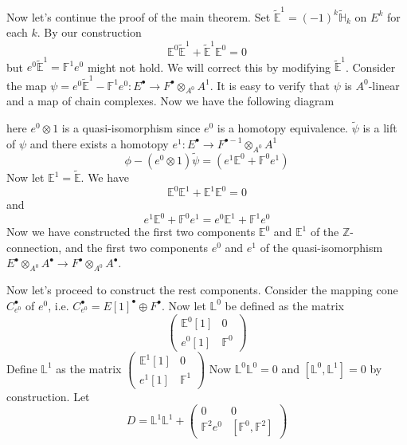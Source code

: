 \documentclass[12pt]{amsart}
\theoremstyle{definition}
\theoremstyle{remark}
\numberwithin{equation}{section}
\newcommand{\A}{{A}}
\newcommand{\Z}{{\mathbb{Z}}}
\newcommand{\1}{{\mathbb{1}}}
\newcommand{\bt}{\bullet}
\begin{document}
Now let's continue the proof of the main theorem. Set $\tilde{\mathbb{E}}^1 = (-1)^k \tilde{\mathbb{H}}_k$ on $E^k$ for each $k$. By our construction
\begin{equation*}
    \mathbb{E}^0 \tilde{\mathbb{E}}^1 + \tilde{\mathbb{E}}^1 \mathbb{E}^0 = 0
\end{equation*}
but $e^0\tilde{\mathbb{E}}^1 = \mathbb{F}^1 e^0$ might not hold. We will correct this by modifying $\tilde{\mathbb{E}}^1$. Consider the map $\psi = e^0\tilde{\mathbb{E}}^1 - \mathbb{F}^1 e^0: E^{\bt} \to F^{\bt}\otimes_{\A^0} \A^{1}$. It is easy to verify that $\psi$ is $\A^0$-linear and a map of chain complexes. Now we have the following diagram

\begin{center}
\end{center}
here $e^0\otimes 1$ is a quasi-isomorphism since $e^0$ is a homotopy equivalence. $\tilde{\psi}$ is a lift of $\psi$ and there exists a homotopy $e^1:E^{\bt} \to  F^{\bt - 1}\otimes_{\A^0} \A^{1}$
$$
\phi - (e^0\otimes 1)\tilde{\psi} = (e^1 \mathbb{E}^0 + \mathbb{F}^0 e^1)
$$
Now let $\mathbb{E}^1 = \tilde{\mathbb{E}}$. We have
\begin{equation*}
    \mathbb{E}^0\mathbb{E}^1 + \mathbb{E}^1\mathbb{E}^0 =0
\end{equation*}
and 
\begin{equation*}
    e^1 \mathbb{E}^0 + \mathbb{F}^0 e^1 = e^0 \mathbb{E}^1 + \mathbb{F}^1 e^0
\end{equation*}
Now we have constructed the first two components $\mathbb{E}^0$ and $\mathbb{E}^1$ of the $\Z$-connection, and the first two components $e^0$ and $e^1$ of the quasi-isomorphism $E^{\bt}\otimes_{\A^0} \A^{\bt} \to F^{\bt}\otimes_{\A^0} \A^{\bt}$.

Now let's proceed to construct the rest components. Consider the mapping cone $C_{e^0}^{\bt}$ of $e^0$, i.e. $C_{e^0}^{\bt} = E[1]^{\bt} \oplus F^{\bt}$.  Now let $\mathbb{L}^0$ be defined as the matrix
$$
\begin{pmatrix}
\mathbb{E}^0[1] & 0 \\
e^0[1] & \mathbb{F}^0 
\end{pmatrix}
$$
Define $\mathbb{L}^1$ as the matrix 
$\begin{pmatrix}
\mathbb{E}^1[1] & 0 \\
e^1[1] & \mathbb{F}^1
\end{pmatrix}
$
Now $\mathbb{L}^0\mathbb{L}^0 = 0$ and $[\mathbb{L}^0, \mathbb{L}^1] = 0$ by construction. Let
\begin{equation*}
    D = \mathbb{L}^1\mathbb{L}^1 +
    \begin{pmatrix}
0 & 0 \\
\mathbb{F}^2e^0 & [\mathbb{F}^0, \mathbb{F}^2]
\end{pmatrix}
\end{equation*}
\end{document}
